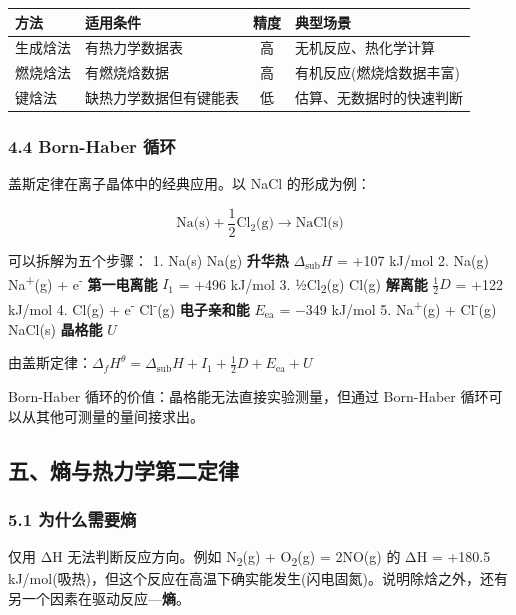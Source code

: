 {\def\LTcaptype{none} %
\begin{longtable}[]{@{}llcl@{}}
\toprule\noalign{}
方法 & 适用条件 & 精度 & 典型场景 \\
\midrule\noalign{}
\endhead
\bottomrule\noalign{}
\endlastfoot
生成焓法 & 有热力学数据表 & 高 & 无机反应、热化学计算 \\
燃烧焓法 & 有燃烧焓数据 & 高 & 有机反应(燃烧焓数据丰富) \\
键焓法 & 缺热力学数据但有键能表 & 低 & 估算、无数据时的快速判断 \\
\end{longtable}
}

\subsubsection{4.4 Born-Haber 循环}\label{born-haber-ux5faaux73af}

盖斯定律在离子晶体中的经典应用。以 NaCl 的形成为例：

\[\text{Na(s)} + \frac{1}{2}\text{Cl}_2\text{(g)} \to \text{NaCl(s)}\]

可以拆解为五个步骤：
1. Na(s) \箭 Na(g) \textbf{升华热} \(\Delta_{\text{sub}}H\) = +107 kJ/mol
2. Na(g) \箭 Na\textsuperscript{+}(g) + e\textsuperscript{-} \textbf{第一电离能} \(I_1\) = +496 kJ/mol
3. ½Cl\textsubscript{2}(g) \箭 Cl(g) \textbf{解离能} \(\frac{1}{2}D\) = +122 kJ/mol
4. Cl(g) + e\textsuperscript{-} \箭 Cl\textsuperscript{-}(g) \textbf{电子亲和能} \(E_{\text{ea}}\) = −349 kJ/mol
5. Na\textsuperscript{+}(g) + Cl\textsuperscript{-}(g) \箭 NaCl(s) \textbf{晶格能} \(U\)

由盖斯定律：\(\Delta_f H^\theta = \Delta_{\text{sub}}H + I_1 + \frac{1}{2}D + E_{\text{ea}} + U\)

Born-Haber 循环的价值：晶格能无法直接实验测量，但通过 Born-Haber 循环可以从其他可测量的量间接求出。

\subsection{五、熵与热力学第二定律}\label{ux4e94ux71b5ux4e0eux70edux529bux5b66ux7b2cux4e8cux5b9aux5f8b}

\subsubsection{5.1 为什么需要熵}\label{ux4e3aux4ec0ux4e48ux9700ux8981ux71b5}

仅用 ΔH 无法判断反应方向。例如 N\textsubscript{2}(g) + O\textsubscript{2}(g) = 2NO(g) 的 ΔH = +180.5 kJ/mol(吸热)，但这个反应在高温下确实能发生(闪电固氮)。说明除焓之外，还有另一个因素在驱动反应---\textbf{熵}。

